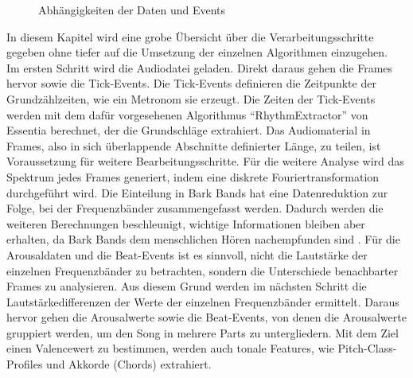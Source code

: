 \documentclass[11pt,a4paper]{article}
\begin{document}
\begin{wrapfigure}{r}{0.5\linewidth}
\captionsetup{justification=centering}
\caption[Abhängigkeiten der Daten und Events]{Abhängigkeiten der Daten und Events}
\label{fig:DatenUndEventsAbhaengigkeiten}
\end{wrapfigure}
\noindent
In diesem Kapitel wird eine grobe Übersicht über die Verarbeitungsschritte gegeben ohne tiefer auf die Umsetzung der einzelnen Algorithmen einzugehen.\\
Im ersten Schritt wird die Audiodatei geladen. Direkt daraus gehen die Frames hervor sowie die Tick-Events. Die Tick-Events definieren die Zeitpunkte der Grundzählzeiten, wie ein Metronom sie erzeugt. Die Zeiten der Tick-Events werden mit dem dafür vorgesehenen Algorithmus ``RhythmExtractor'' von Essentia berechnet, der die Grundschläge extrahiert. Das Audiomaterial in Frames, also in sich überlappende Abschnitte definierter Länge, zu teilen, ist Voraussetzung für weitere Bearbeitungsschritte. Für die weitere Analyse wird das Spektrum jedes Frames generiert, indem eine diskrete Fouriertransformation durchgeführt wird. Die Einteilung in Bark Bands hat eine Datenreduktion zur Folge, bei der Frequenzbänder zusammengefasst werden. Dadurch werden die weiteren Berechnungen beschleunigt, wichtige Informationen bleiben aber erhalten, da Bark Bands dem menschlichen Hören nachempfunden sind \cite[S. 80]{lerch2012introduction}. Für die Arousaldaten und die Beat-Events ist es sinnvoll, nicht die Lautstärke der einzelnen Frequenzbänder zu betrachten, sondern die Unterschiede benachbarter Frames zu analysieren. Aus diesem Grund werden im nächsten Schritt die Lautstärkedifferenzen der Werte der einzelnen Frequenzbänder ermittelt. Daraus hervor gehen die Arousalwerte sowie die Beat-Events, von denen die Arousalwerte gruppiert werden, um den Song in mehrere Parts zu untergliedern. Mit dem Ziel einen Valencewert zu bestimmen, werden auch tonale Features, wie Pitch-Class-Profiles und Akkorde (Chords) extrahiert.\\
\end{document}
